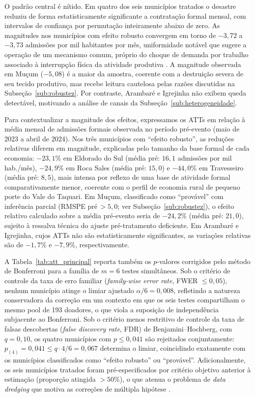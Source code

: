 \documentclass[a4paper,12pt]{article}
\begin{document}
O padrão central é nítido. Em quatro dos seis municípios tratados o desastre
reduziu de forma estatisticamente significante a contratação formal mensal,
com intervalos de confiança por permutação inteiramente abaixo de zero. As
magnitudes nos municípios com efeito robusto convergem em torno de
$-3{,}72$ a $-3{,}73$ admissões por mil habitantes por mês, uniformidade
notável que sugere a operação de um mecanismo comum, próprio do choque de
demanda por trabalho associado à interrupção física da atividade produtiva
\cite{haddad2015economic}. A magnitude observada em Mu\c{c}um ($-5{,}08$) é a maior
da amostra, coerente com a destruição severa de seu tecido produtivo, mas
recebe leitura cautelosa pelas razões discutidas na
Subseção~\ref{sub:robustez}. Por contraste, Arambaré e Igrejinha não exibem
queda detectável, motivando a análise de canais da
Subseção~\ref{sub:heterogeneidade}.

Para contextualizar a magnitude dos efeitos, expressamos os ATTs em relação à
média mensal de admissões formais observada no período pré-evento (maio de 2023 a
abril de 2024). Nos três municípios com ``efeito robusto'', as reduções relativas
diferem em magnitude, explicadas pelo tamanho da base formal de cada economia:
$-23{,}1\%$ em Eldorado do Sul (média pré: $16{,}1$ admissões por mil\,hab./mês),
$-24{,}9\%$ em Roca Sales (média pré: $15{,}0$) e $-44{,}0\%$ em Travesseiro
(média pré: $8{,}5$), mais intensa por reflexo de uma base de atividade
formal comparativamente menor, coerente com o perfil de economia rural de pequeno
porte do Vale do Taquari.
Em Mu\c{c}um, classificado como ``provável'' com inferência parcial (RMSPE
pré\,$> 5{,}0$; ver Subseção~\ref{sub:robustez}), o efeito relativo calculado
sobre a média pré-evento seria de $-24{,}2\%$ (média pré: $21{,}0$), sujeito à
ressalva técnica do ajuste pré-tratamento deficiente. Em Arambaré e Igrejinha,
cujos ATTs não são estatisticamente significantes, as variações relativas são de
$-1{,}7\%$ e $-7{,}9\%$, respectivamente.

A Tabela~\ref{tab:att_principal} reporta também os $p$-valores corrigidos pelo
método de Bonferroni para a família de $m = 6$ testes simultâneos. Sob o
critério de controle da taxa de erro familiar (\textit{family-wise error rate},
FWER $\leq 0{,}05$), nenhum município atinge o limiar ajustado $\alpha/6 = 0{,}008$,
refletindo a natureza conservadora da correção em um contexto em que os seis testes
compartilham o mesmo pool de 193 doadores, o que viola a suposição de independência
subjacente ao Bonferroni. Sob o critério menos restritivo de controle da taxa de
falsas descobertas (\textit{false discovery rate}, FDR) de Benjamini--Hochberg,
com $q = 0{,}10$, os quatro municípios com $p \leq 0{,}041$ são rejeitados
conjuntamente: $p_{(4)} = 0{,}041 \leq q \cdot 4/6 = 0{,}067$ determina o
limiar, coincidindo exatamente com os municípios classificados como ``efeito
robusto'' ou ``provável''. Adicionalmente, os seis municípios tratados foram
pré-especificados por critério objetivo anterior à estimação (proporção
atingida $> 50\%$), o que atenua o problema de \textit{data dredging} que
motiva as correções de múltipla hipótese \cite{angrist2009}.
\end{document}
